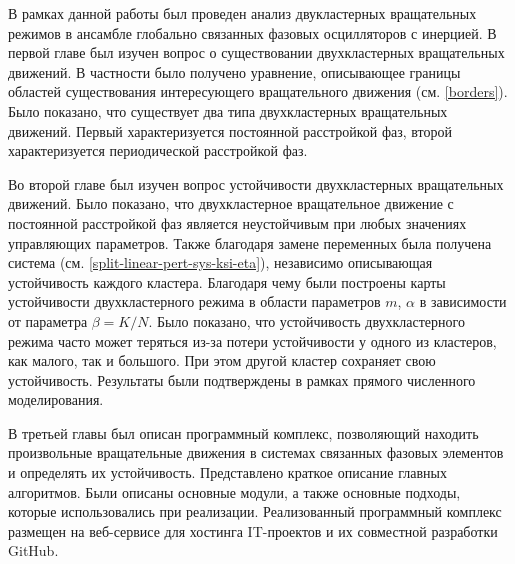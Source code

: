 В рамках данной работы был проведен анализ двукластерных вращательных режимов в ансамбле глобально связанных фазовых осцилляторов с инерцией. 
В первой главе был изучен вопрос о существовании двухкластерных
вращательных движений. В частности было получено уравнение,
описывающее границы областей существования интересующего вращательного 
движения (см. \eqref{borders}). Было показано, что существует два типа
двухкластерных вращательных движений. Первый характеризуется постоянной
расстройкой фаз, второй характеризуется периодической расстройкой фаз.


Во второй главе был изучен вопрос устойчивости двухкластерных
вращательных движений. Было показано, что двухкластерное вращательное
движение с постоянной расстройкой фаз является неустойчивым при любых значениях
управляющих параметров. Также благодаря замене переменных была получена система (см. \eqref{split-linear-pert-sys-ksi-eta}),
независимо описывающая устойчивость каждого кластера. Благодаря чему были построены карты
устойчивости двухкластерного режима в области параметров $m$, $\alpha$ в зависимости от
параметра $\beta = K/N$. Было показано, что устойчивость
двухкластерного режима часто может теряться из-за потери устойчивости
у одного из кластеров, как малого, так и большого. При этом другой кластер
сохраняет свою устойчивость. Результаты были подтверждены в рамках прямого
численного моделирования.

В третьей главы был описан программный комплекс, позволяющий находить произвольные
вращательные движения в системах связанных фазовых элементов и определять их устойчивость. Представлено краткое описание главных алгоритмов.
Были описаны основные модули, а также
основные подходы, которые использовались при реализации.
Реализованный программный комплекс размещен на веб-сервисе для хостинга IT-проектов и их совместной разработки GitHub.
